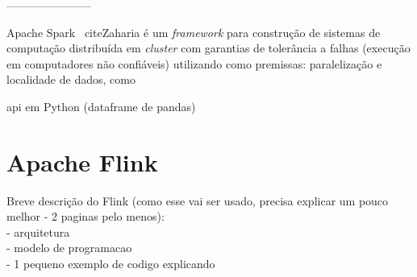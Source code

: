 -----------------------

Apache Spark \ cite{Zaharia} é um \emph{framework} para construção de sistemas
de computação distribuída em \emph{cluster} com garantias de tolerância a falhas
(execução em computadores não confiáveis) utilizando como premissas: paralelização
e localidade de dados, como 

api em Python (dataframe de pandas)


\section{Apache Flink}

Breve descrição do Flink (como esse vai ser usado, precisa explicar um pouco melhor - 2 paginas pelo menos):\\
- arquitetura\\
- modelo de programacao\\
- 1 pequeno exemplo de codigo explicando







